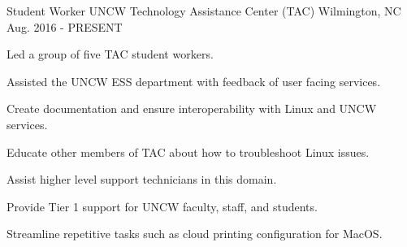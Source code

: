 

\begin{cventries}
  \cventry
    {Student Worker}
    {UNCW Technology Assistance Center (TAC)} %
    {Wilmington, NC} %
    {Aug. 2016 - PRESENT} %
    {
      \begin{cvsubentries}
        {
          \begin{cvsubitems}
            \item {Led a group of five TAC student workers.}
            \item {Assisted the UNCW ESS department with feedback of user facing services.}
          \end{cvsubitems}
        }
        {
          \begin{cvsubitems}
            \item {Create documentation and ensure interoperability with Linux and UNCW services.}
            \item {Educate other members of TAC about how to troubleshoot Linux issues.}
            \item {Assist higher level support technicians in this domain.}
          \end{cvsubitems}
        }
        {
          \begin{cvsubitems}
            \item {Provide Tier 1 support for UNCW faculty, staff, and students.}
            \item {Streamline repetitive tasks such as cloud printing configuration for MacOS.}
          \end{cvsubitems}
        }
      \end{cvsubentries}
    }


\end{cventries}
